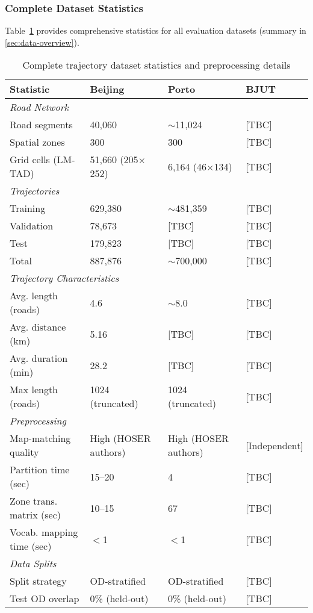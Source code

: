 \subsubsection{Complete Dataset Statistics}
\label{app:dataset-stats}

Table~\ref{tab:dataset-stats-appendix} provides comprehensive statistics for all evaluation datasets (summary in \autoref{sec:data-overview}).

\begin{table}[H]
\centering
\caption{Complete trajectory dataset statistics and preprocessing details}
\label{tab:dataset-stats-appendix}
\small
\begin{tabular}{llll}
\toprule
\textbf{Statistic} & \textbf{Beijing} & \textbf{Porto} & \textbf{BJUT} \\
\midrule
\multicolumn{4}{l}{\textit{Road Network}} \\
\quad Road segments & 40,060 & $\sim$11,024 & [TBC] \\
\quad Spatial zones & 300 & 300 & [TBC] \\
\quad Grid cells (LM-TAD) & 51,660 (205$\times$252) & 6,164 (46$\times$134) & [TBC] \\
\midrule
\multicolumn{4}{l}{\textit{Trajectories}} \\
\quad Training & 629,380 & $\sim$481,359 & [TBC] \\
\quad Validation & 78,673 & [TBC] & [TBC] \\
\quad Test & 179,823 & [TBC] & [TBC] \\
\quad Total & 887,876 & $\sim$700,000 & [TBC] \\
\midrule
\multicolumn{4}{l}{\textit{Trajectory Characteristics}} \\
\quad Avg. length (roads) & 4.6 & $\sim$8.0 & [TBC] \\
\quad Avg. distance (km) & 5.16 & [TBC] & [TBC] \\
\quad Avg. duration (min) & 28.2 & [TBC] & [TBC] \\
\quad Max length (roads) & 1024 (truncated) & 1024 (truncated) & [TBC] \\
\midrule
\multicolumn{4}{l}{\textit{Preprocessing}} \\
\quad Map-matching quality & High (HOSER authors) & High (HOSER authors) & [Independent] \\
\quad Partition time (sec) & 15--20 & 4 & [TBC] \\
\quad Zone trans. matrix (sec) & 10--15 & 67 & [TBC] \\
\quad Vocab. mapping time (sec) & $<$1 & $<$1 & [TBC] \\
\midrule
\multicolumn{4}{l}{\textit{Data Splits}} \\
\quad Split strategy & OD-stratified & OD-stratified & [TBC] \\
\quad Test OD overlap & 0\% (held-out) & 0\% (held-out) & [TBC] \\
\bottomrule
\end{tabular}
\end{table}

